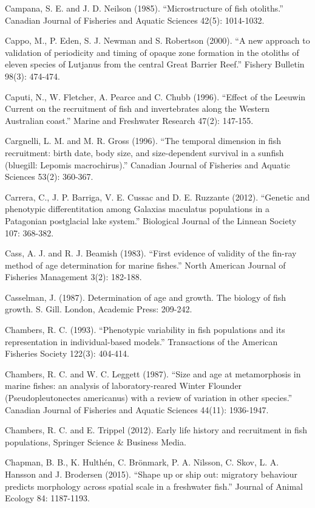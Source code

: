 \documentclass[]{book}
\begin{document}
Campana, S. E. and J. D. Neilson (1985). ``Microstructure of fish
otoliths.'' Canadian Journal of Fisheries and Aquatic Sciences 42(5):
1014-1032.

Cappo, M., P. Eden, S. J. Newman and S. Robertson (2000). ``A new
approach to validation of periodicity and timing of opaque zone
formation in the otoliths of eleven species of Lutjanus from the central
Great Barrier Reef.'' Fishery Bulletin 98(3): 474-474.

Caputi, N., W. Fletcher, A. Pearce and C. Chubb (1996). ``Effect of the
Leeuwin Current on the recruitment of fish and invertebrates along the
Western Australian coast.'' Marine and Freshwater Research 47(2):
147-155.

Cargnelli, L. M. and M. R. Gross (1996). ``The temporal dimension in
fish recruitment: birth date, body size, and size-dependent survival in
a sunfish (bluegill: Lepomis macrochirus).'' Canadian Journal of
Fisheries and Aquatic Sciences 53(2): 360-367.

Carrera, C., J. P. Barriga, V. E. Cussac and D. E. Ruzzante (2012).
``Genetic and phenotypic differentitation among Galaxias maculatus
populations in a Patagonian postglacial lake system.'' Biological
Journal of the Linnean Society 107: 368-382.

Cass, A. J. and R. J. Beamish (1983). ``First evidence of validity of
the fin-ray method of age determination for marine fishes.'' North
American Journal of Fisheries Management 3(2): 182-188.

Casselman, J. (1987). Determination of age and growth. The biology of
fish growth. S. Gill. London, Academic Press: 209-242.

Chambers, R. C. (1993). ``Phenotypic variability in fish populations and
its representation in individual-based models.'' Transactions of the
American Fisheries Society 122(3): 404-414.

Chambers, R. C. and W. C. Leggett (1987). ``Size and age at
metamorphosis in marine fishes: an analysis of laboratory-reared Winter
Flounder (Pseudopleutonectes americanus) with a review of variation in
other species.'' Canadian Journal of Fisheries and Aquatic Sciences
44(11): 1936-1947.

Chambers, R. C. and E. Trippel (2012). Early life history and
recruitment in fish populations, Springer Science \& Business Media.

Chapman, B. B., K. Hulthén, C. Brönmark, P. A. Nilsson, C. Skov, L. A.
Hansson and J. Brodersen (2015). ``Shape up or ship out: migratory
behaviour predicts morphology across spatial scale in a freshwater
fish.'' Journal of Animal Ecology 84: 1187-1193.
\end{document}
